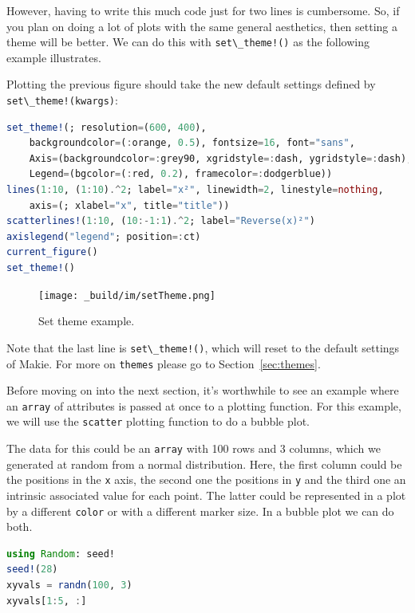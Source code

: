 \documentclass[
  notoc %
]{tufte-book}
\newcommand{\passthrough}[1]{#1}
\begin{document}
However, having to write this much code just for two lines is
cumbersome. So, if you plan on doing a lot of plots with the same
general aesthetics, then setting a theme will be better. We can do this
with \passthrough{\lstinline"set\_theme!()"} as the following example
illustrates.

Plotting the previous figure should take the new default settings
defined by \passthrough{\lstinline"set\_theme!(kwargs)"}:

\begin{lstlisting}[language=Julia]
set_theme!(; resolution=(600, 400),
    backgroundcolor=(:orange, 0.5), fontsize=16, font="sans",
    Axis=(backgroundcolor=:grey90, xgridstyle=:dash, ygridstyle=:dash),
    Legend=(bgcolor=(:red, 0.2), framecolor=:dodgerblue))
lines(1:10, (1:10).^2; label="x²", linewidth=2, linestyle=nothing,
    axis=(; xlabel="x", title="title"))
scatterlines!(1:10, (10:-1:1).^2; label="Reverse(x)²")
axislegend("legend"; position=:ct)
current_figure()
set_theme!()
\end{lstlisting}

\begin{figure}
\hypertarget{fig:setTheme}{%
\centering
\texttt{[image: \_build/im/setTheme.png]}
\caption{Set theme example.}\label{fig:setTheme}
}
\end{figure}

Note that the last line is \passthrough{\lstinline"set\_theme!()"},
which will reset to the default settings of Makie. For more on
\passthrough{\lstinline!themes!} please go to Section~\ref{sec:themes}.

Before moving on into the next section, it's worthwhile to see an
example where an \passthrough{\lstinline!array!} of attributes is passed
at once to a plotting function. For this example, we will use the
\passthrough{\lstinline!scatter!} plotting function to do a bubble plot.

The data for this could be an \passthrough{\lstinline!array!} with 100
rows and 3 columns, which we generated at random from a normal
distribution. Here, the first column could be the positions in the
\passthrough{\lstinline!x!} axis, the second one the positions in
\passthrough{\lstinline!y!} and the third one an intrinsic associated
value for each point. The latter could be represented in a plot by a
different \passthrough{\lstinline!color!} or with a different marker
size. In a bubble plot we can do both.

\begin{lstlisting}[language=Julia]
using Random: seed!
seed!(28)
xyvals = randn(100, 3)
xyvals[1:5, :]
\end{lstlisting}
\end{document}
